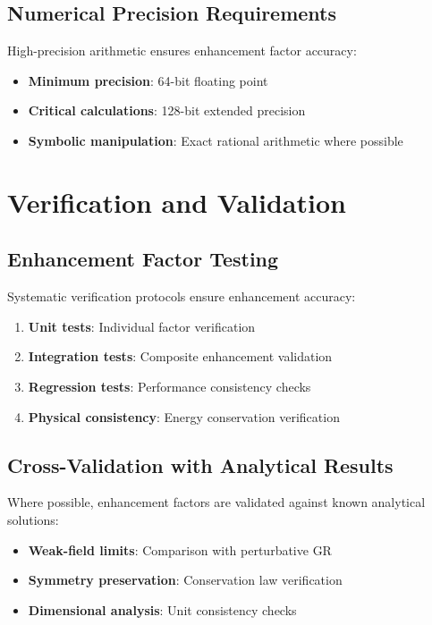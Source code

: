 \documentclass[12pt,a4paper]{article}
\begin{document}
\subsection{Numerical Precision Requirements}

High-precision arithmetic ensures enhancement factor accuracy:

\begin{itemize}
\item \textbf{Minimum precision}: 64-bit floating point
\item \textbf{Critical calculations}: 128-bit extended precision
\item \textbf{Symbolic manipulation}: Exact rational arithmetic where possible
\end{itemize}

\section{Verification and Validation}

\subsection{Enhancement Factor Testing}

Systematic verification protocols ensure enhancement accuracy:

\begin{enumerate}
\item \textbf{Unit tests}: Individual factor verification
\item \textbf{Integration tests}: Composite enhancement validation
\item \textbf{Regression tests}: Performance consistency checks
\item \textbf{Physical consistency}: Energy conservation verification
\end{enumerate}

\subsection{Cross-Validation with Analytical Results}

Where possible, enhancement factors are validated against known analytical solutions:

\begin{itemize}
\item \textbf{Weak-field limits}: Comparison with perturbative GR
\item \textbf{Symmetry preservation}: Conservation law verification
\item \textbf{Dimensional analysis}: Unit consistency checks
\end{itemize}
\end{document}
